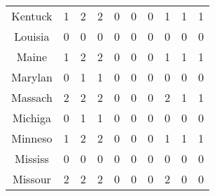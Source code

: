 \begin{longtable}{cp{1.5cm}p{1.5cm}p{1.5cm}p{1.5cm}p{1.5cm}p{1.5cm}p{1.5cm}p{1.5cm}p{1.5cm}}
Kentuck &                          1 &                             2 &                          2 &                        0 &                           0 &                        0 &                         1 &                            1 &                         1 \\
Louisia &                          0 &                             0 &                          0 &                        0 &                           0 &                        0 &                         0 &                            0 &                         0 \\
Maine   &                          1 &                             2 &                          2 &                        0 &                           0 &                        0 &                         1 &                            1 &                         1 \\
Marylan &                          0 &                             1 &                          1 &                        0 &                           0 &                        0 &                         0 &                            0 &                         0 \\
Massach &                          2 &                             2 &                          2 &                        0 &                           0 &                        0 &                         2 &                            1 &                         1 \\
Michiga &                          0 &                             1 &                          1 &                        0 &                           0 &                        0 &                         0 &                            0 &                         0 \\
Minneso &                          1 &                             2 &                          2 &                        0 &                           0 &                        0 &                         1 &                            1 &                         1 \\
Mississ &                          0 &                             0 &                          0 &                        0 &                           0 &                        0 &                         0 &                            0 &                         0 \\
Missour &                          2 &                             2 &                          2 &                        0 &                           0 &                        0 &                         2 &                            0 &                         0 \\

\end{longtable}
